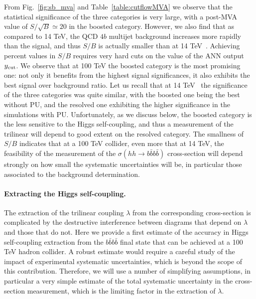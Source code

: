 \documentclass[a4paper,10pt]{article}
\begin{document}
From Fig.~\ref{fig:sb_mva} and Table~\ref{table:cutflowMVA} we observe that the statistical
significance of the three categories is very large, with a post-MVA value of
$S/\sqrt{B}\simeq 20$ in the boosted
category.
%
However, we also find that as compared to 14 TeV, the QCD
$4b$ multijet background increases
more rapidly than the signal, and thus $S/B$ is actually smaller than at 14 TeV~\cite{Behr:2015oqq}.
%
Achieving  percent values in $S/B$ requires very hard cuts on the value of the ANN output $y_{\rm cut}$.
%
We observe that at 100 TeV the boosted category is the most promising one: not only
it benefits from the highest signal significances, it also exhibits
the best signal over background ratio.
%
Let us recall that at 14 TeV~\cite{Behr:2015oqq} the  significance
of the three categories was quite similar, with the boosted one being the best without PU, and
the resolved one
exhibiting the higher significance in the simulations with PU.
%
Unfortunately, as we discuss below, the boosted category is the less sensitive to the Higgs self-coupling,
and thus a measurement of the trilinear will depend to good extent on the resolved category.
%
The smallness of $S/B$ indicates that
at a 100 TeV collider, even more that at 14 TeV, the feasibility of the measurement
of the $\sigma(hh\to b\bar{b}b\bar{b})$ cross-section
will depend strongly on how small the systematic
uncertainties will be, in particular those associated to the background determination.

\paragraph{Extracting the Higgs self-coupling.}
%
The extraction of the trilinear coupling $\lambda$ from the
  corresponding cross-section is complicated by the
  destructive interference
  between diagrams that depend on $\lambda$ and those that do not.
 Here we provide a first estimate of the accuracy
  in Higgs self-coupling extraction from the $b\bar{b}b\bar{b}$ final state
  that can be achieved at a 100 TeV hadron collider.
  A robust estimate  would require
  a careful study of the impact of
  experimental systematic uncertainties, which is beyond the scope of this contribution.
  Therefore, we will use a number of simplifying assumptions, in particular
  a very simple estimate of the total systematic uncertainty in the cross-section
  measurement, which is the limiting factor in the extraction of $\lambda$.
\end{document}
